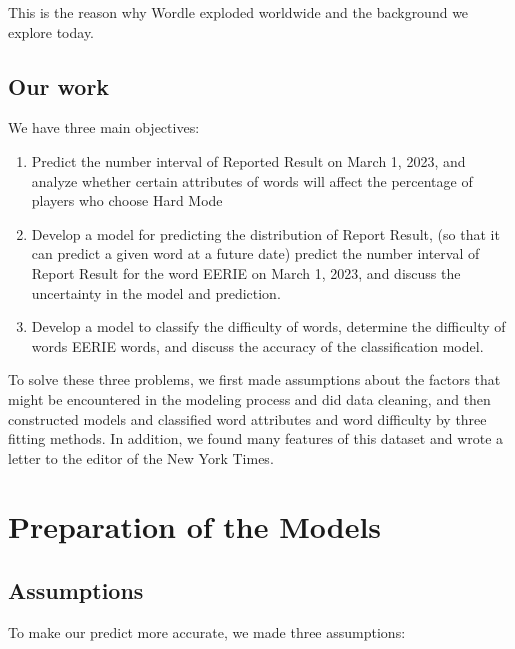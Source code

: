 \documentclass[12pt]{article}  %
\begin{document}
This is the reason why Wordle exploded worldwide and the background we explore today.


\subsection{Our work}
We have three main objectives:

\begin{enumerate}[\bfseries (1)]
    \item Predict the number interval of Reported Result on March 1, 2023, and analyze whether certain attributes of words will affect the percentage of players who choose Hard Mode
    \item Develop a model for predicting the distribution of Report Result, (so that it can predict a given word at a future date) predict the number interval of Report Result for the word EERIE on March 1, 2023, and discuss the uncertainty in the model and prediction.
    \item Develop a model to classify the difficulty of words, determine the difficulty of words EERIE words, and discuss the accuracy of the classification model.
\end{enumerate}

To solve these three problems, we first made assumptions about the factors that might be encountered in the modeling process and did data cleaning, and then constructed models and classified word attributes and word difficulty by three fitting methods. In addition, we found many features of this dataset and wrote a letter to the editor of the New York Times.



\section{Preparation of the Models}
\subsection{Assumptions}
To make our predict more accurate, we made three assumptions:
\end{document}
